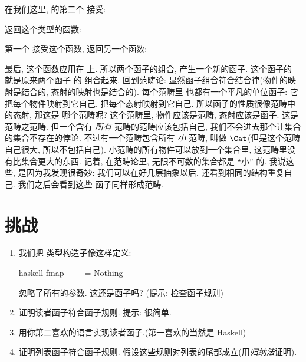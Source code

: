 在我们这里,  的第二个  接受:

返回这个类型的函数:

第一个  接受这个函数, 返回另一个函数:

最后, 这个函数应用在  上. 所以两个函子的组合, 产生一个新的函子. 这个函子的  就是原来两个函子
的  组合起来. 回到范畴论: 显然函子组合符合结合律(物件的映射是结合的, 态射的映射也是结合的). 每个范畴里
也都有一个平凡的单位函子: 它把每个物件映射到它自己, 把每个态射映射到它自己. 所以函子的性质很像范畴中的态射, 那这是
哪个范畴呢? 这个范畴里, 物件应该是范畴, 态射应该是函子. 这是范畴之范畴. 但一个含有 \emph{所有} 范畴的范畴应该包括自己,
我们不会进去那个让集合的集合不存在的悖论. 不过有一个范畴包含所有 \emph{小} 范畴, 叫做 $\Cat$(但是这个范畴自己很大,
所以不包括自己). 小范畴的所有物件可以放到一个集合里, 这范畴里没有比集合更大的东西. 记着, 在范畴论里, 无限不可数的集合都是
``小'' 的. 我说这些, 是因为我发现很奇妙: 我们可以在好几层抽象以后, 还看到相同的结构重复自己. 我们之后会看到这些
函子同样形成范畴.

\section{挑战}

\begin{enumerate}
  \tightlist
  \item
        我们把  类型构造子像这样定义:

        \begin{snip}{haskell}
fmap _ _ = Nothing
\end{snip}

        忽略了所有的参数. 这还是函子吗? (提示: 检查函子规则)
  \item
        证明读者函子符合函子规则. 提示: 很简单.
  \item
        用你第二喜欢的语言实现读者函子.(第一喜欢的当然是 Haskell)
  \item
        证明列表函子符合函子规则. 假设这些规则对列表的尾部成立(用\emph{归纳法}证明).
\end{enumerate}
